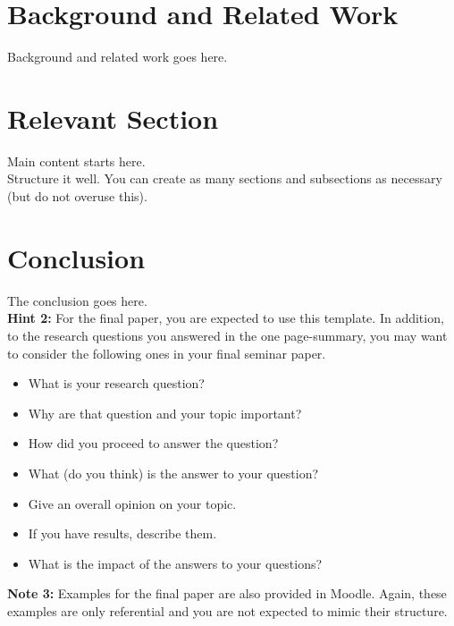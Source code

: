 \documentclass[sigconf]{acmart}
\begin{document}
\section{Background and Related Work}
Background and related work goes here.

\section{Relevant Section}
Main content starts here. \nocite{*} \\
Structure it well. You can create as many sections and subsections as necessary (but do not overuse this).

\section{Conclusion}
The conclusion goes here.\\

\textbf{Hint 2:} For the final paper, you are expected to use this template. In addition, to the research questions you answered in the one page-summary, you may want to consider the following ones in your final seminar paper.
  \begin{itemize}
  \item What is your research question?
  \item Why are that question and your topic important?
  \item How did you proceed to answer the question?
  \item What (do you think) is the answer to your question?
  \item Give an overall opinion on your topic.
  \item If you have results, describe them.
  \item What is the impact of the answers to your questions?
  \end{itemize}
  
\textbf{Note 3:} Examples for the final paper are also provided in Moodle. Again, these examples are only referential and you are not expected to mimic their structure. 


\newpage

 
\end{document}
